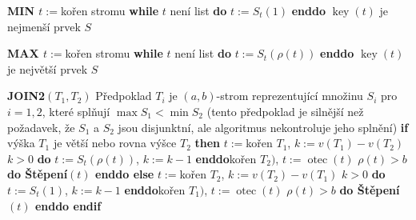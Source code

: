 \documentclass[a4paper,12pt]{article}
\DeclareMathOperator*{\otec}{otec}
\DeclareMathOperator*{\key}{key}
\begin{document}
{\bf MIN\newline 
$t:=$}kořen stromu\newline 
{\bf while} $t$ není list {\bf do} $t:=S_t(1)$ {\bf enddo}\newline 
$\key(t)$ je nejmenší prvek $S$

{\bf MAX\newline 
$t:=$}kořen stromu\newline 
{\bf while} $t$ není list {\bf do} $t:=S_t(\rho (t))$ {\bf enddo}\newline 
$\key(t)$ je největší prvek $S$

{\bf JOIN2$(T_1,T_2)$}\newline
Předpoklad $T_i$ je $(a,b)$-strom reprezentující 
množinu $S_i$ pro $i=1,2$, které splňují $\max S_1<\min 
S_2$ 
(tento předpoklad je silnější než požadavek, že $
S_1$ a 
$S_2$ jsou disjunktní, ale algoritmus nekontroluje jeho splnění)\newline 
{\bf if} výška $T_1$ je větší nebo rovna výšce $T_2$ {\bf then}\newline 
\phantom{---}$t:=$kořen $T_1$, $k:=v(T_1)-v(T_2)$\newline 
\phantom{---}{\bf while} $k>0$ {\bf do} $t:=S_t(\rho (t))$, $k:=k-1$ {\bf enddo}\newline \phantom{---}{\bf Spojení$(t,$}kořen $T_2)$, $t:=\otec(t)$\newline 
\phantom{---}{\bf while} $\rho (t)>b$ {\bf do Štěpení$(t)$ enddo\newline 
else}\newline 
\phantom{---}$t:=$kořen $T_2$, $k:=v(T_2)-v(T_1)$ \newline 
\phantom{---}{\bf while} $k>0$ {\bf do} $t:=S_t(1)$, $k:=k-1$ {\bf enddo}\newline \phantom{---}{\bf Spojení$(t,$}kořen $T_1)$, $t:=\otec(t)$\newline 
\phantom{---}{\bf while} $\rho (t)>b$ {\bf do Štěpení$(t)$ enddo\newline 
endif}
\end{document}
